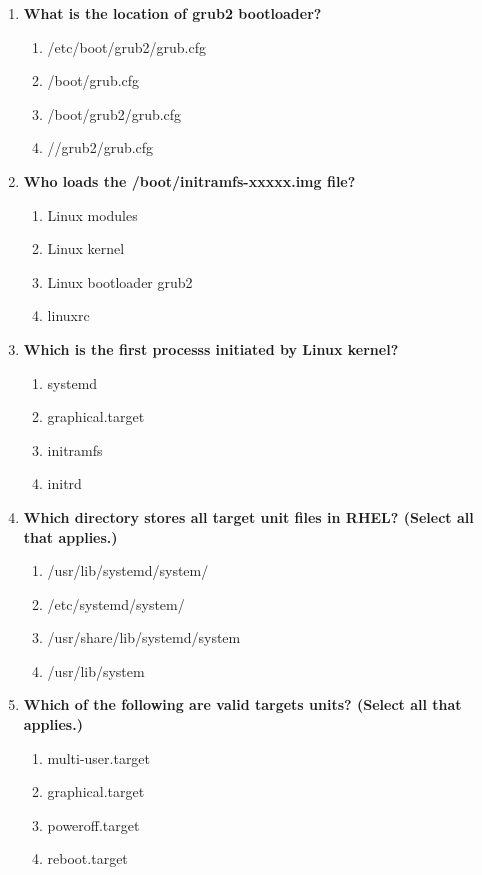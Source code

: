 \begin{flushleft}
\begin{enumerate}
		\item \textbf{What is the location of grub2 bootloader?}
		\begin{enumerate}[label=(\alph*)]
			\item /etc/boot/grub2/grub.cfg
			\item /boot/grub.cfg
			\item /boot/grub2/grub.cfg  %
			\item //grub2/grub.cfg
		\end{enumerate}
		\bigskip
		\bigskip
		\newpage
		\item \textbf{Who loads the /boot/initramfs-xxxxx.img file?}
		\begin{enumerate}[label=(\alph*)]
			\item Linux modules
			\item Linux kernel   %
			\item Linux bootloader grub2  
			\item linuxrc
		\end{enumerate}
		\bigskip
		\bigskip	

		\item \textbf{Which is the first processs initiated by Linux kernel?}
		\begin{enumerate}[label=(\alph*)]
			\item systemd  %
			\item graphical.target
			\item initramfs
			\item initrd
		\end{enumerate}
		\bigskip
		\bigskip

		\item \textbf{Which directory stores all target unit files in RHEL? (Select all that applies.)}
		\begin{enumerate}[label=(\alph*)]
			\item /usr/lib/systemd/system/  %
			\item /etc/systemd/system/  %
			\item /usr/share/lib/systemd/system
			\item /usr/lib/system
		\end{enumerate}
		\bigskip
		\bigskip

		\item \textbf{Which of the following are valid targets units? (Select all that applies.)}
		\begin{enumerate}[label=(\alph*)]
			\item multi-user.target  %
			\item graphical.target  %
			\item poweroff.target  %
			\item reboot.target    %
		\end{enumerate}
		\bigskip
		\bigskip


\end{enumerate}
\end{flushleft}
